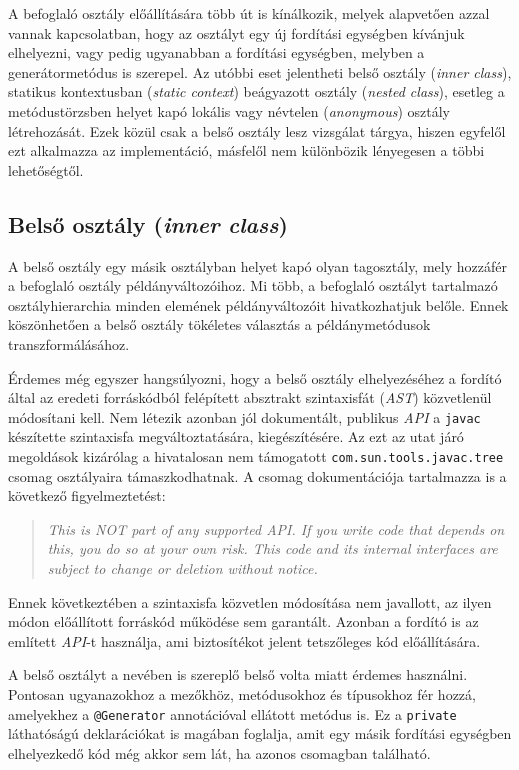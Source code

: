 A befoglaló osztály előállítására több út is kínálkozik, melyek alapvetően azzal vannak kapcsolatban, hogy az osztályt egy új fordítási egységben kívánjuk elhelyezni, vagy pedig ugyanabban a fordítási egységben, melyben a generátormetódus is szerepel. Az utóbbi eset jelentheti belső osztály (\textit{inner class}), statikus kontextusban (\textit{static context}) beágyazott osztály (\textit{nested class}), esetleg a metódustörzsben helyet kapó lokális vagy névtelen (\textit{anonymous}) osztály létrehozását. Ezek közül csak a belső osztály lesz vizsgálat tárgya, hiszen egyfelől ezt alkalmazza az implementáció, másfelől nem különbözik lényegesen a többi lehetőségtől.

\subsection{Belső osztály (\textit{inner class})}

A belső osztály egy másik osztályban helyet kapó olyan tagosztály, mely hozzáfér a befoglaló osztály példányváltozóihoz. Mi több, a befoglaló osztályt tartalmazó osztályhierarchia minden elemének példányváltozóit hivatkozhatjuk belőle. Ennek köszönhetően a belső osztály tökéletes választás a példánymetódusok transzformálásához.

Érdemes még egyszer hangsúlyozni, hogy a belső osztály elhelyezéséhez a fordító által az eredeti forráskódból felépített absztrakt szintaxisfát (\textit{AST}) közvetlenül módosítani kell. Nem létezik azonban jól dokumentált, publikus \textit{API} a \texttt{javac} készítette szintaxisfa megváltoztatására, kiegészítésére. Az ezt az utat járó megoldások kizárólag a hivatalosan nem támogatott \texttt{com.sun.tools.javac.tree} csomag osztályaira támaszkodhatnak. A csomag dokumentációja tartalmazza is a következő figyelmeztetést:

\begin{quote}
	\textit{This is NOT part of any supported API. If you write code that depends on this, you do so at your own risk. This code and its internal interfaces are subject to change or deletion without notice.}
\end{quote}

Ennek következtében a szintaxisfa közvetlen módosítása nem javallott, az ilyen módon előállított forráskód működése sem garantált. Azonban a fordító is az említett \textit{API}-t használja, ami biztosítékot jelent tetszőleges kód előállítására.

A belső osztályt a nevében is szereplő belső volta miatt érdemes használni. Pontosan ugyanazokhoz a mezőkhöz, metódusokhoz és típusokhoz fér hozzá, amelyekhez a \texttt{@Generator} annotációval ellátott metódus is. Ez a \texttt{private} láthatóságú deklarációkat is magában foglalja, amit egy másik fordítási egységben elhelyezkedő kód még akkor sem lát, ha azonos csomagban található. 

